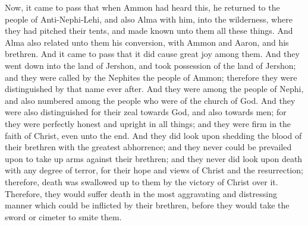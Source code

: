Now, it came to pass that when Ammon had heard this, he returned to the people of Anti-Nephi-Lehi, and also Alma with him, into the wilderness, where they had pitched their tents, and made known unto them all these things. And Alma also related unto them his conversion, with Ammon and Aaron, and his brethren.
\bverse \iffalse And it came to pass that it did cause great joy among them.  And they went down into the land of Jershon, and took possession of the land of Jershon; and they were called by the Nephites the people of Ammon; therefore they were distinguished by that name ever after. \fi
And it came to pass that it did cause great joy among them.  And they went down into the land of Jershon, and took possession of the land of Jershon; and they were called by the Nephites the people of Ammon; therefore they were distinguished by that name ever after.
\bverse \iffalse And they were among the people of Nephi, and also numbered among the people who were of the church of God. And they were also distinguished for their zeal towards God, and also towards men; for they were perfectly honest and upright in all things; and they were firm in the faith of Christ, even unto the end. \fi
And they were among the people of Nephi, and also numbered among the people who were of the church of God. And they were also distinguished for their zeal towards God, and also towards men; for they were perfectly honest and upright in all things; and they were firm in the faith of Christ, even unto the end.
\bverse \iffalse And they did look upon shedding the blood of their brethren with the greatest abhorrence; and they never could be prevailed upon to take up arms against their brethren; and they never did look upon death with any degree of terror, for their hope and views of Christ and the resurrection; therefore, death was swallowed up to them by the victory of Christ over it. \fi
And they did look upon shedding the blood of their brethren with the greatest abhorrence; and they never could be prevailed upon to take up arms against their brethren; and they never did look upon death with any degree of terror, for their hope and views of Christ and the resurrection; therefore, death was swallowed up to them by the victory of Christ over it.
\bverse \iffalse Therefore, they would suffer death in the most aggravating and distressing manner which could be inflicted by their brethren, before they would take the sword or cimeter to smite them. \fi
Therefore, they would suffer death in the most aggravating and distressing manner which could be inflicted by their brethren, before they would take the sword or cimeter to smite them.
